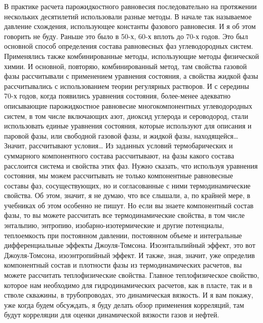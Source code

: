 \documentclass[main.tex]{subfiles}
\begin{document}
В практике расчета парожидкостного равновесия последовательно на протяжении нескольких десятилетий использовали разные методы.
В начале так называемое давление схождения, использующее константы фазового равновесия.
И я об этом говорить не буду.
Раньше это было в 50-х, 60-х вплоть до 70-х годов.
Это был основной способ определения состава равновесных фаз углеводородных систем.
Применялись также комбинированные методы, использующие методы физической химии.
И основной, повторяю, комбинированный метод, там свойства газовой фазы рассчитывали с применением уравнения состояния, а свойства жидкой фазы рассчитывались с использованием теории регулярных растворов.
И с середины 70-х годов, когда появились уравнения состояния, более-менее адекватно описывающие парожидкостное равновесие многокомпонентных углеводородных систем, в том числе включающих азот, диоксид углерода и сероводород, стали использовать единые уравнения состояния, которые используют для описания и паровой фазы, или свободной газовой фазы, и жидкой фазы, находящейся…
Значит, рассчитывают условия…
Из заданных условий термобарических и суммарного компонентного состава рассчитывают, на фазы какого состава расслоится система и свойства этих фаз.
Нужно сказать, что используя уравнения состояния, мы можем рассчитывать не только компонентные равновесные составы фаз, сосуществующих, но и согласованные с ними термодинамические свойства.
Об этом, значит, я не думаю, что все слышали, а, по крайней мере, в учебниках об этом особенно не пишут.
Но если вы знаете компонентный состав фазы, то вы можете рассчитать все термодинамические свойства, в том числе энтальпию, энтропию, изобарно-изотермические и другие потенциалы, теплоемкость при постоянном давлении, постоянном объеме и интегральные дифференциальные эффекты Джоуля-Томсона.
Изоэнтальпийный эффект, это вот Джоуля-Томсона, изоэнтропийный эффект.
И также, зная, значит, уже определив компонентный состав и плотности фазы из термодинамических расчетов, вы можете рассчитать теплофизические свойства.
Главное теплофизическое свойство, которое нам необходимо для гидродинамических расчетов, как в пласте, так и в стволе скважины, в трубопроводах, это динамическая вязкость.
И я вам покажу, уже когда будем обсуждать, я буду делать обзор применения корреляций, там будут корреляции для оценки динамической вязкости газов и нефтей.
\end{document}
